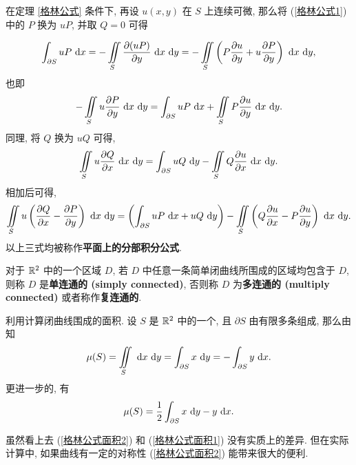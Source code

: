 在定理 \ref{格林公式} 条件下, 再设 $u(x,y)$ 在 $S$ 上连续可微, 那么将 (\ref{格林公式1}) 中的 $P$ 换为 $uP$, 并取 $Q=0$ 可得

\begin{equation*}
	\int_{\partial S} uP\ \text {d} x = -\iint\limits_{S}\frac{\partial(uP)}{\partial y}\ \text {d} x\ \text {d} y = -\iint\limits_{S}\left(P\frac{\partial u}{\partial y}+u\frac{\partial P}{\partial y}\right) \ \text {d} x\ \text {d} y,
\end{equation*}
也即
\begin{equation}\label{格林公式2}
	-\iint\limits_{S}u\frac{\partial P}{\partial y}\ \text {d} x\ \text {d} y=\int_{\partial S}uP\ \text {d} x+\iint\limits_{S} P\frac{\partial u}{\partial y}\ \text {d} x\ \text {d} y.
\end{equation}
同理, 将 $Q$ 换为 $uQ$ 可得,
\begin{equation}\label{格林公式3}
	\iint\limits_{S}u\frac{\partial Q}{\partial x}\ \text {d} x\ \text {d} y=\int_{\partial S}uQ\ \text {d} y-\iint\limits_{S} Q\frac{\partial u}{\partial x}\ \text {d} x\ \text {d} y.
\end{equation}
相加后可得,
\begin{equation}
	\iint\limits_{S}u\left(\frac{\partial Q}{\partial x}-\frac{\partial P}{\partial y}\right)\ \text {d} x\ \text {d} y=\left(\int_{\partial S}uP\ \text {d} x + uQ\ \text {d} y\right)-\iint\limits_{S}\left( Q\frac{\partial u}{\partial x}-P\frac{\partial u}{\partial y}\right)\ \text {d} x\ \text {d} y.
\end{equation}
以上三式均被称作\textbf{平面上的分部积分公式}.


\begin{definition}\label{单连通}\label{复连通}\label{多连通}
	对于 $\mathbb R^2$ 中的一个区域 $D$, 若 $D$ 中任意一条简单闭曲线所围成的区域均包含于 $D$, 则称 $D$ 是\textbf{单连通的 (simply connected)}, 否则称 $D$ 为\textbf{多连通的 (multiply connected)} 或者称作\textbf{复连通的}.
\end{definition}

\begin{proposition}
	利用计算闭曲线围成的面积. 设 $S$ 是 $\mathbb R^2$ 中的一个, 且 $\partial S$ 由有限多条组成, 那么由知
	\begin{equation}\label{格林公式面积1}
		\mu(S)=\iint\limits_{S}\ \text {d} x\ \text {d} y = \int_{\partial S}x\ \text {d} y=-\int_{\partial S}y \ \text {d} x.
	\end{equation}
	更进一步的, 有
	\begin{equation}\label{格林公式面积2}
		\mu(S)=\frac 1 2\int_{\partial S}x\ \text {d} y-y\ \text {d} x.
	\end{equation}

	虽然看上去 (\ref{格林公式面积2}) 和 (\ref{格林公式面积1}) 没有实质上的差异. 但在实际计算中, 如果曲线有一定的对称性 (\ref{格林公式面积2}) 能带来很大的便利.
\end{proposition}

